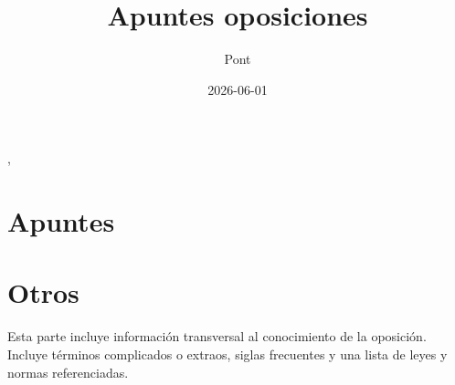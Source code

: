 \documentclass[12pt, oneside]{book}
\title{Apuntes oposiciones} %
\author{Pont}%
\date{2026-06-01}
\begin{document}

    \maketitle
    \tableofcontents
    \setcounter{tocdepth}{3},
    \newpage
    \part{Apuntes}
    
    

    \newpage
    \part{Otros}
    \setcounter{section}{0}
    Esta parte incluye información transversal al conocimiento de la oposición. Incluye términos complicados o extraos, siglas frecuentes y una lista de leyes y normas referenciadas.
    
    \newpage
    
    \newpage
    
\end{document}
